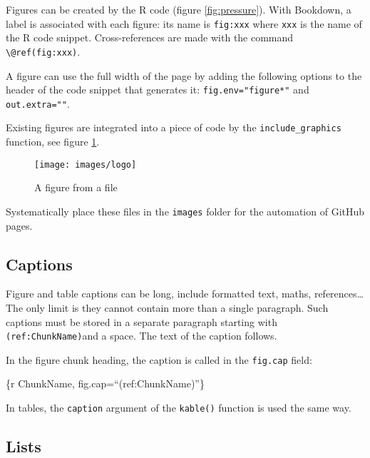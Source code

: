 \documentclass[fleqn,]{article} %
\begin{document}
\normalsize

Figures can be created by the R code (figure \ref{fig:pressure}).
With Bookdown, a label is associated with each figure: its name is \texttt{fig:xxx} where \texttt{xxx} is the name of the R code snippet.
Cross-references are made with the command \texttt{\textbackslash{}@ref(fig:xxx)}.

A figure can use the full width of the page by adding the following options to the header of the code snippet that generates it: \texttt{fig.env="figure*"} and \texttt{out.extra=""}.

Existing figures are integrated into a piece of code by the \texttt{include\_graphics} function, see figure \ref{fig:logo}.

\scriptsize

\begin{figure}

{\centering \texttt{[image: images/logo]} 

}

\caption{A figure from a file}\label{fig:logo}
\end{figure}

\normalsize

Systematically place these files in the \texttt{images} folder for the automation of GitHub pages.

\hypertarget{captions}{%
\subsection{Captions}\label{captions}}

Figure and table captions can be long, include formatted text, maths, references\ldots{}
The only limit is they cannot contain more than a single paragraph.
Such captions must be stored in a separate paragraph starting with \texttt{(ref:ChunkName)}and a space.
The text of the caption follows.

In the figure chunk heading, the caption is called in the \texttt{fig.cap} field:

\{r ChunkName, fig.cap=\enquote{(ref:ChunkName)}\}

In tables, the \texttt{caption} argument of the \texttt{kable()} function is used the same way.

\hypertarget{lists}{%
\subsection{Lists}\label{lists}}
\end{document}
